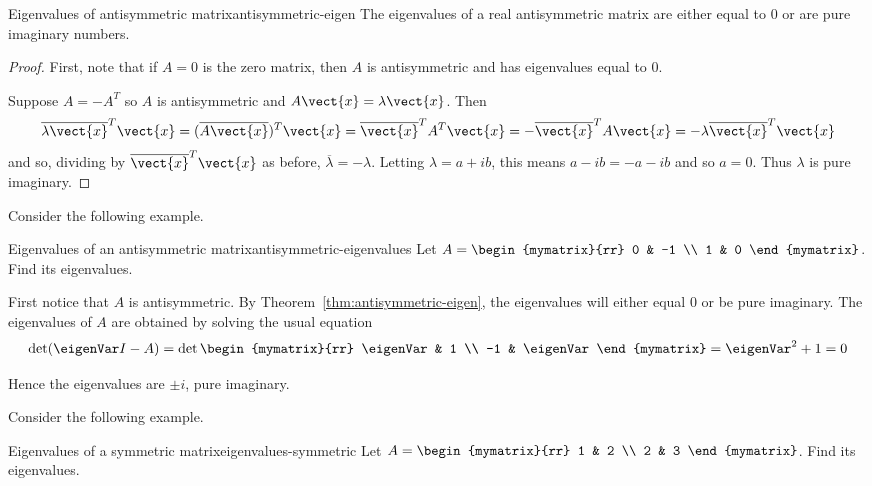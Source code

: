 \begin{theorem}{Eigenvalues of antisymmetric matrix}{antisymmetric-eigen}
The eigenvalues of a real antisymmetric matrix are either equal to $0$ or are pure imaginary numbers.
\end{theorem}

\begin{proof}
First, note that if $A=0$ is the zero matrix, then $A$ is antisymmetric and has eigenvalues equal to $0$. 

Suppose $A=-A^{T}$ so $A$ is antisymmetric and $A\vect{x}=\lambda 
\vect{x}$. Then 
\begin{equation*}
\overline{\lambda \vect{x}}^{T}\vect{x}=(\overline{A
\vect{x}}) ^{T}\vect{x}=\overline{\vect{x}}^{T}A^{T}\vect{x}=-
\overline{\vect{x}}^{T}A\vect{x}=-\lambda \overline{\vect{x}}^{T}
\vect{x}
\end{equation*}
and so, dividing by $\overline{\vect{x}}^{T}\vect{x}$ as before, $
\overline{\lambda }=-\lambda$. Letting $\lambda =a+ib$, this means $
a-ib=-a-ib$ and so $a=0$. Thus $\lambda $ is pure imaginary. 
\end{proof}

Consider the following example. 

\begin{example}{Eigenvalues of an antisymmetric matrix}{antisymmetric-eigenvalues}
Let $A=\begin{mymatrix}{rr}
0 & -1 \\
1 & 0
\end{mymatrix}$.  Find its eigenvalues.
\end{example}

\begin{solution}
First notice that $A$ is antisymmetric. By Theorem~\ref{thm:antisymmetric-eigen}, the eigenvalues will either equal $0$ or be pure imaginary.  The eigenvalues of $A$ are obtained by solving the usual equation 
\[
\det (\eigenVar I - A ) = 
\det \begin{mymatrix}{rr}
\eigenVar & 1 \\ 
-1 & \eigenVar
\end{mymatrix} =\eigenVar ^{2}+1=0
\]

Hence the eigenvalues are $\pm i$, pure
imaginary.
\end{solution}

Consider the following example.

\begin{example}{Eigenvalues of a symmetric matrix}{eigenvalues-symmetric}
Let $A=\begin{mymatrix}{rr}
1 & 2 \\
2 & 3
\end{mymatrix}$. Find its eigenvalues.
\end{example}

